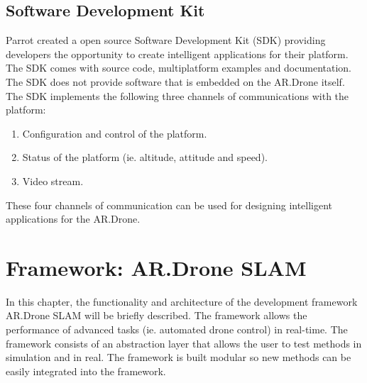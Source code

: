 \documentclass[a4paper]{article}
\begin{document}
\subsection{Software Development Kit}
Parrot created a open source Software Development Kit (SDK) providing developers the opportunity to create intelligent applications for their platform. The SDK comes with source code, multiplatform examples and documentation. The SDK does not provide software that is embedded on the AR.Drone itself. The SDK implements the following three channels of communications with the platform:
\begin{enumerate}
\item Configuration and control of the platform.
\item Status of the platform (ie. altitude, attitude and speed).
\item Video stream.
\end{enumerate}
These four channels of communication can be used for designing intelligent applications for the AR.Drone.

\newpage
\section{Framework: AR.Drone SLAM}
\label{framework}
In this chapter, the functionality and architecture of the development framework AR.Drone SLAM \cite{Dijkshoorn2012} will be briefly described. The framework allows the performance of advanced tasks (ie. automated drone control) in real-time. The framework consists of an abstraction layer that allows the user to test methods in simulation and in real. The framework is built modular so new methods can be  easily integrated into the framework.
\end{document}
